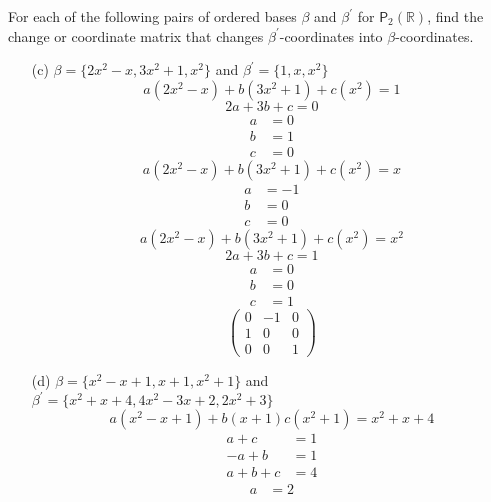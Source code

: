 For each of the following pairs of ordered bases $\beta$ and $\beta^\prime$
for $\mathsf{P}_2(\mathbb{R})$, find the change or coordinate matrix
that changes $\beta^\prime$-coordinates into $\beta$-coordinates.
\begin{enumerate}[(a)]
\item[(c)] $\beta = \{2x^2-x,3x^2+1,x^2\}$ and $\beta^\prime = \{1,x,x^2\}$
\begin{equation}
a(2x^2-x) + b(3x^2 +1) +c(x^2) =1 
\end{equation}
\begin{equation}
2a+3b+c = 0
\end{equation}
\begin{align}
a&=0\\
b&=1\\
c&=0
\end{align}
\begin{equation}
a(2x^2-x) + b(3x^2+1) +c(x^2) = x
\end{equation}
\begin{align}
a&=-1\\
b&=0\\
c&=0
\end{align}
\begin{equation}
a(2x^2-x) +b(3x^2+1) +c(x^2) = x^2
\end{equation}
\begin{equation}
2a +3b +c = 1
\end{equation}
\begin{align}
a&=0\\
b&=0\\
c&=1
\end{align}
\begin{equation}
\begin{pmatrix}
0&-1&0\\
1&0&0\\
0&0&1
\end{pmatrix}
\end{equation}
\item[(d)] $\beta = \{x^2 -x+1,x+1,x^2+1\}$ 
  and $\beta^\prime = \{x^2 +x+4,4x^2-3x+2,2x^2+3\}$
\begin{equation}
a(x^2-x+1) + b(x+1) c(x^2 + 1) = x^2 +x +4
\end{equation}
\begin{align}
a +c &=1\\
-a + b &=1\\
a +b+c &=4
\end{align}
\begin{align}
a&=2\\

\end{align}
\end{enumerate}
